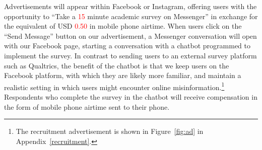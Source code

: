 \documentclass[letterpaper, 12pt, parskip=full,]{scrartcl}
\begin{document}
Advertisements will appear within Facebook or Instagram, offering users with the opportunity to ``Take a \textcolor{red}{15} minute academic survey on Messenger'' in exchange for the equivalent of USD \textcolor{red}{0.50} in mobile phone airtime. When users click on the ``Send Message'' button on our advertisement, a Messenger conversation will open with our Facebook page, starting a conversation with a chatbot programmed to implement the survey. In contrast to sending users to an external survey platform such as Qualtrics, the benefit of the chatbot is that we keep users on the Facebook platform, with which they are likely more familiar, and maintain a realistic setting in which users might encounter online misinformation.\footnote{The recruitment advertisement is shown in Figure~\ref{fig:ad} in Appendix~\ref{recruitment}. \color{red}{[[TK: images of chatbot once linked to page]]}} Respondents who complete the survey in the chatbot will receive compensation in the form of mobile phone airtime sent to their phone. %
\end{document}
